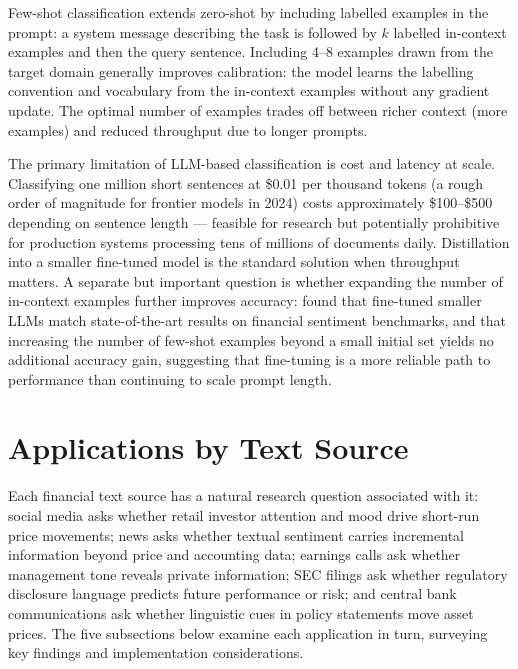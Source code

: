 Few-shot classification extends zero-shot by including labelled examples in the prompt: a system message describing the task is followed by $k$ labelled in-context examples and then the query sentence. Including 4--8 examples drawn from the target domain generally improves calibration: the model learns the labelling convention and vocabulary from the in-context examples without any gradient update. The optimal number of examples trades off between richer context (more examples) and reduced throughput due to longer prompts.

The primary limitation of LLM-based classification is cost and latency at scale. Classifying one million short sentences at \$0.01 per thousand tokens (a rough order of magnitude for frontier models in 2024) costs approximately \$100--\$500 depending on sentence length --- feasible for research but potentially prohibitive for production systems processing tens of millions of documents daily. Distillation into a smaller fine-tuned model is the standard solution when throughput matters. A separate but important question is whether expanding the number of in-context examples further improves accuracy: \citet{FatemiHu2023} found that fine-tuned smaller LLMs match state-of-the-art results on financial sentiment benchmarks, and that increasing the number of few-shot examples beyond a small initial set yields no additional accuracy gain, suggesting that fine-tuning is a more reliable path to performance than continuing to scale prompt length.

\section{Applications by Text Source}
\label{sec:ch09-applications-by-text-source}

\begin{context}

Each financial text source has a natural research question associated with it: social media asks whether retail investor attention and mood drive short-run price movements; news asks whether textual sentiment carries incremental information beyond price and accounting data; earnings calls ask whether management tone reveals private information; SEC filings ask whether regulatory disclosure language predicts future performance or risk; and central bank communications ask whether linguistic cues in policy statements move asset prices. The five subsections below examine each application in turn, surveying key findings and implementation considerations.

\end{context}

